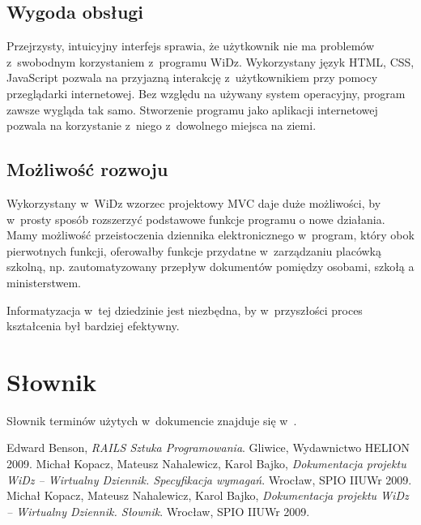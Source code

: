 \documentclass[12pt,leqno,twoside]{mwart}
\begin{document}
\subsection{Wygoda obsługi}
\noindent Przejrzysty, intuicyjny interfejs sprawia, że użytkownik nie ma problemów z~swobodnym korzystaniem z~programu WiDz. Wykorzystany język HTML, CSS, JavaScript pozwala na przyjazną interakcję z~użytkownikiem przy pomocy przeglądarki internetowej. Bez względu na używany system operacyjny, program zawsze wygląda tak samo. Stworzenie programu jako aplikacji internetowej pozwala na korzystanie z~niego z~dowolnego miejsca na ziemi.

\subsection{Możliwość rozwoju}
\noindent Wykorzystany w~WiDz wzorzec projektowy MVC daje duże możliwości, by w~prosty sposób rozszerzyć podstawowe funkcje programu o nowe działania. Mamy możliwość przeistoczenia dziennika elektronicznego w~program, który obok pierwotnych funkcji, oferowałby funkcje przydatne w~zarządzaniu placówką szkolną, np. zautomatyzowany przepływ dokumentów pomiędzy osobami, szkołą a ministerstwem.

\indent Informatyzacja w~tej dziedzinie jest niezbędna, by w~przyszłości proces kształcenia był bardziej efektywny.

\section{Słownik}
\noindent Słownik terminów użytych w~dokumencie znajduje się w~\cite{SLO}.

\begin{thebibliography}{99}
 Edward Benson, {\it RAILS Sztuka Programowania}. Gliwice, Wydawnictwo HELION 2009.
 Michał Kopacz, Mateusz Nahalewicz, Karol Bajko, {\it Dokumentacja projektu WiDz -- Wirtualny Dziennik. Specyfikacja wymagań}. Wrocław, SPIO IIUWr 2009.
 Michał Kopacz, Mateusz Nahalewicz, Karol Bajko, {\it Dokumentacja projektu WiDz -- Wirtualny Dziennik. Słownik}. Wrocław, SPIO IIUWr 2009.
\end{thebibliography}
\end{document}

